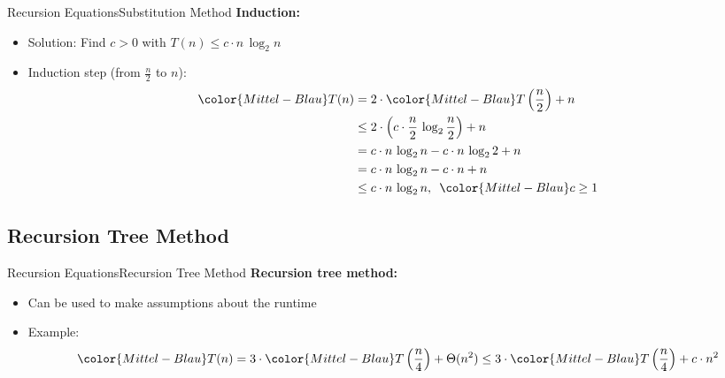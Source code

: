 
\begin{frame}{Recursion Equations}{Substitution Method}
  \textbf{Induction:}
  \begin{itemize}
    \item
      Solution: Find {\color{Mittel-Blau}$c > 0$} with
      {\color{Mittel-Blau}$T(n) \leq c \cdot n \, \log_2 n$}
    \item
      Induction step (from {\color{Mittel-Blau}$\frac{n}{2}$} to
      {\color{Mittel-Blau}$n$}):
      \begin{align*}
        {\color{Mittel-Blau}T(n)} & =
          2 \cdot {\color{Mittel-Blau}T\left(\dfrac{n}{2}\right)} + n\\
        {} & \leq 2 \cdot \left(
          c \cdot \dfrac{n}{2} \, \log_2 \dfrac{n}{2}\right) + n\\
        {} & = c \cdot n \, \log_2 n - c \cdot n \, \log_2 2 + n\\
        {} & = c \cdot n \, \log_2 n - c \cdot n + n\\
        {} & \leq c \cdot n \, \log_2 n,
          \hspace{0.5em} {\color{Mittel-Blau}c \geq 1}
      \end{align*}
  \end{itemize}
\end{frame}


\subsection{Recursion Tree Method}

\begin{frame}{Recursion Equations}{Recursion Tree Method}
  \textbf{Recursion tree method:}
  \begin{itemize}
    \item
      Can be used to make assumptions about the runtime
    \item
      Example:\\
      \begin{displaymath}
        {\color{Mittel-Blau}T(n)}
        = 3 \cdot {\color{Mittel-Blau}T\left(\dfrac{n}{4}\right)} + \Theta(n^2)
        \leq 3 \cdot {\color{Mittel-Blau}T\left(\dfrac{n}{4}\right)} + c \cdot 
        n^2
      \end{displaymath}
  \end{itemize}
\end{frame}


